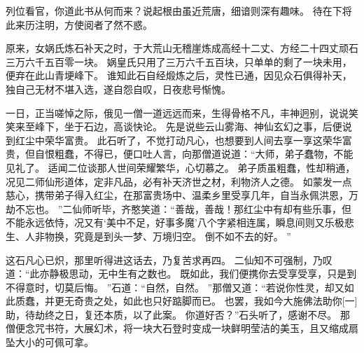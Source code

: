 列位看官，你道此书从何而来？说起根由虽近荒唐，细谙则深有趣味。
待在下将此来历注明，方使阅者了然不惑。
\par
原来，女娲氏炼石补天之时，于大荒山无稽崖炼成高经十二丈、方经二十四丈顽石三万六千五百零一块。
娲皇氏只用了三万六千五百块，只单单的剩了一块未用，便弃在此山青埂峰下。
谁知此石自经煅炼之后，灵性已通，因见众石俱得补天，独自己无材不堪入选，遂自怨自叹，日夜悲号惭愧。
\par
一日，正当嗟悼之际，俄见一僧一道远远而来，生得骨格不凡，丰神迥别，说说笑笑来至峰下，坐于石边，高谈快论。
先是说些云山雾海、神仙玄幻之事，后便说到红尘中荣华富贵。
此石听了，不觉打动凡心，也想要到人间去享一享这荣华富贵，但自恨粗蠢，不得已，便口吐人言，向那僧道说道：“大师，弟子蠢物，不能见礼了。
适闻二位谈那人世间荣耀繁华，心切慕之。
弟子质虽粗蠢，性却稍通，况见二师仙形道体，定非凡品，必有补天济世之材，利物济人之德。
如蒙发一点慈心，携带弟子得入红尘，在那富贵场中、温柔乡里受享几年，自当永佩洪恩，万劫不忘也。
”二仙师听毕，齐憨笑道：“善哉，善哉！那红尘中有却有些乐事，但不能永远依恃，况又有‘美中不足，好事多魔’八个字紧相连属，瞬息间则又乐极悲生、人非物换，究竟是到头一梦、万境归空。
倒不如不去的好。
”\par
这石凡心已炽，那里听得进这话去，乃复苦求再四。
二仙知不可强制，乃叹道：“此亦静极思动，无中生有之数也。
既如此，我们便携你去受享受享，只是到不得意时，切莫后悔。
”石道：“自然，自然。
”那僧又道：“若说你性灵，却又如此质蠢，并更无奇贵之处，如此也只好踮脚而已。
也罢，我如今大施佛法助你[一]助，待劫终之日，复还本质，以了此案。
你道好否？”石头听了，感谢不尽。
那僧便念咒书符，大展幻术，将一块大石登时变成一块鲜明莹洁的美玉，且又缩成扇坠大小的可佩可拿。
